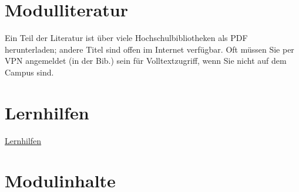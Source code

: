 \documentclass[
]{book}
\begin{document}
\hypertarget{modulliteratur}{%
\chapter{Modulliteratur}\label{modulliteratur}}

Ein Teil der Literatur ist über viele Hochschulbibliotheken als PDF herunterladen;
andere Titel sind offen im Internet verfügbar.
Oft müssen Sie per VPN angemeldet (in der Bib.) sein für Volltextzugriff, wenn Sie nicht auf dem Campus sind.

\hypertarget{lernhilfen}{%
\chapter{Lernhilfen}\label{lernhilfen}}

\href{https://sebastiansauer.github.io/fopra/Interna/Lernhilfen.html}{Lernhilfen}

\hypertarget{modulinhalte}{%
\chapter{Modulinhalte}\label{modulinhalte}}

  
\end{document}
